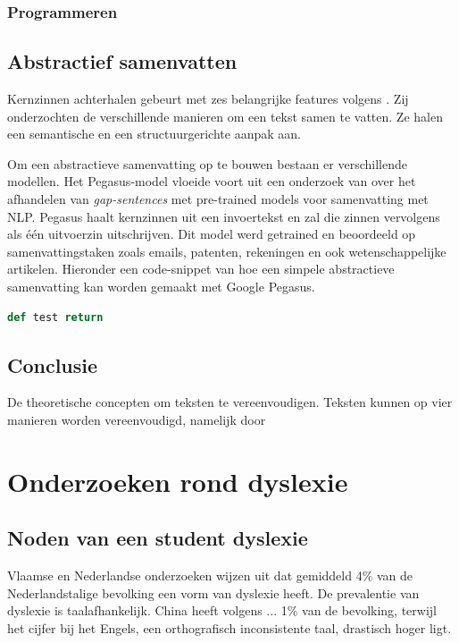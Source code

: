 \subsubsection{Programmeren}

\subsection{Abstractief samenvatten}

Kernzinnen achterhalen gebeurt met zes belangrijke features volgens \textcite{Khan2014}. Zij onderzochten de verschillende manieren om een tekst samen te vatten. Ze halen een semantische en een structuurgerichte aanpak aan.

Om een abstractieve samenvatting op te bouwen bestaan er verschillende modellen. Het Pegasus-model vloeide voort uit een onderzoek van \textcite{Zhang2020} over het afhandelen van \textit{gap-sentences} met pre-trained models voor samenvatting met NLP. Pegasus haalt kernzinnen uit een invoertekst en zal die zinnen vervolgens als één uitvoerzin uitschrijven. Dit model werd getrained en beoordeeld op samenvattingstaken zoals emails, patenten, rekeningen en ook wetenschappelijke artikelen. Hieronder een code-snippet van hoe een simpele abstractieve samenvatting kan worden gemaakt met Google Pegasus.

\begin{lstlisting}[language=Python]
def test return
\end{lstlisting}

\subsection{Conclusie}

De theoretische concepten om teksten te vereenvoudigen. Teksten kunnen op vier manieren worden vereenvoudigd, namelijk door 

\section{Onderzoeken rond dyslexie}

\subsection{Noden van een student dyslexie}

Vlaamse en Nederlandse onderzoeken wijzen uit dat gemiddeld 4\% van de Nederlandstalige bevolking een vorm van dyslexie heeft. De prevalentie van dyslexie is taalafhankelijk. China heeft volgens ... 1\% van de bevolking, terwijl het cijfer bij het Engels, een orthografisch inconsistente taal, drastisch hoger ligt. 

